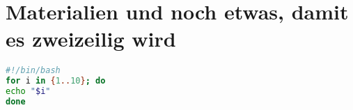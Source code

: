 \section*{Materialien und noch etwas, damit es zweizeilig wird}
\blindtext 
\vspace*{0.5cm}
\begin{lstlisting}[language=bash,caption={Ein Listing},captionpos=b,frame=tb]
#!/bin/bash
for i in {1..10}; do
echo "$i"
done
\end{lstlisting}

